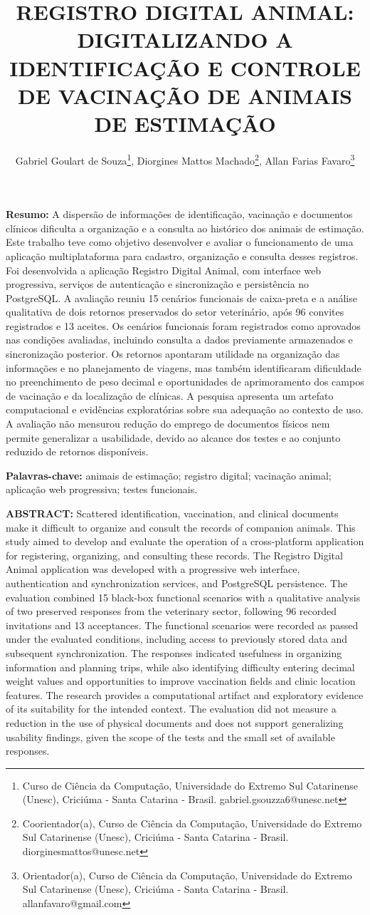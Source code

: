 \documentclass{UNESC}
\title{REGISTRO DIGITAL ANIMAL: DIGITALIZANDO A IDENTIFICAÇÃO E CONTROLE DE VACINAÇÃO DE ANIMAIS DE ESTIMAÇÃO}
\author
{
   Gabriel Goulart de Souza\footnote{Curso de Ciência da Computação, Universidade do Extremo Sul Catarinense (Unesc), Criciúma - Santa Catarina - Brasil. gabriel.gsouzza6@unesc.net},
   Diorgines Mattos Machado\footnote{Coorientador(a), Curso de Ciência da Computação, Universidade do Extremo Sul Catarinense (Unesc), Criciúma - Santa Catarina - Brasil. diorginesmattos@unesc.net},
   Allan Farias Favaro\footnote{Orientador(a), Curso de Ciência da Computação, Universidade do Extremo Sul Catarinense (Unesc), Criciúma - Santa Catarina - Brasil. allanfavaro@gmail.com}
}
\begin{document}
\onehalfspacing

\maketitle

\noindent
\textbf{Resumo:} A dispersão de informações de identificação, vacinação e documentos clínicos dificulta a organização e a consulta ao histórico dos animais de estimação. Este trabalho teve como objetivo desenvolver e avaliar o funcionamento de uma aplicação multiplataforma para cadastro, organização e consulta desses registros. Foi desenvolvida a aplicação Registro Digital Animal, com interface web progressiva, serviços de autenticação e sincronização e persistência no PostgreSQL. A avaliação reuniu 15 cenários funcionais de caixa-preta e a análise qualitativa de dois retornos preservados do setor veterinário, após 96 convites registrados e 13 aceites. Os cenários funcionais foram registrados como aprovados nas condições avaliadas, incluindo consulta a dados previamente armazenados e sincronização posterior. Os retornos apontaram utilidade na organização das informações e no planejamento de viagens, mas também identificaram dificuldade no preenchimento de peso decimal e oportunidades de aprimoramento dos campos de vacinação e da localização de clínicas. A pesquisa apresenta um artefato computacional e evidências exploratórias sobre sua adequação ao contexto de uso. A avaliação não mensurou redução do emprego de documentos físicos nem permite generalizar a usabilidade, devido ao alcance dos testes e ao conjunto reduzido de retornos disponíveis.

\vspace{0.5em}
\noindent
\textbf{Palavras-chave:} animais de estimação; registro digital; vacinação animal; aplicação web progressiva; testes funcionais.

\vspace{1.0em}
\noindent
\textbf{ABSTRACT:} Scattered identification, vaccination, and clinical documents make it difficult to organize and consult the records of companion animals. This study aimed to develop and evaluate the operation of a cross-platform application for registering, organizing, and consulting these records. The Registro Digital Animal application was developed with a progressive web interface, authentication and synchronization services, and PostgreSQL persistence. The evaluation combined 15 black-box functional scenarios with a qualitative analysis of two preserved responses from the veterinary sector, following 96 recorded invitations and 13 acceptances. The functional scenarios were recorded as passed under the evaluated conditions, including access to previously stored data and subsequent synchronization. The responses indicated usefulness in organizing information and planning trips, while also identifying difficulty entering decimal weight values and opportunities to improve vaccination fields and clinic location features. The research provides a computational artifact and exploratory evidence of its suitability for the intended context. The evaluation did not measure a reduction in the use of physical documents and does not support generalizing usability findings, given the scope of the tests and the small set of available responses.
\end{document}
